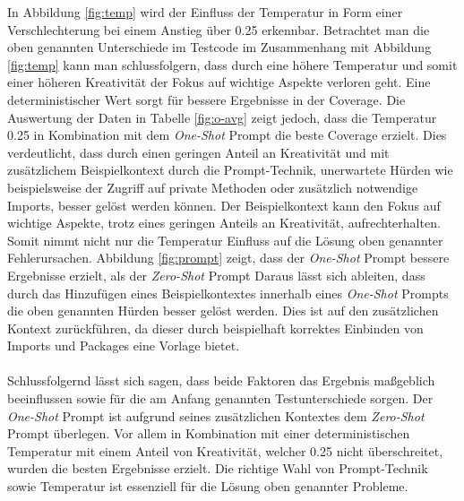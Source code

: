 In Abbildung \ref{fig:temp} wird der Einfluss der Temperatur in Form einer Verschlechterung bei einem Anstieg über 0.25 erkennbar. Betrachtet man die oben genannten Unterschiede im Testcode im Zusammenhang mit Abbildung \ref{fig:temp} kann man schlussfolgern, dass durch eine höhere Temperatur und somit einer höheren Kreativität der Fokus auf wichtige Aspekte verloren geht. Eine deterministischer Wert sorgt für bessere Ergebnisse in der Coverage. Die Auswertung der Daten in Tabelle \ref{fig:o-avg} zeigt jedoch, dass die Temperatur 0.25 in Kombination mit dem \textit{One-Shot} Prompt die beste Coverage erzielt. Dies verdeutlicht, dass durch einen geringen Anteil an Kreativität und mit zusätzlichem Beispielkontext durch die Prompt-Technik, unerwartete Hürden wie beispielsweise der Zugriff auf private Methoden oder zusätzlich notwendige Imports, besser gelöst werden können. Der Beispielkontext kann den Fokus auf wichtige Aspekte, trotz eines geringen Anteils an Kreativität, aufrechterhalten.\\
Somit nimmt nicht nur die Temperatur Einfluss auf die Lösung oben genannter Fehlerursachen. Abbildung \ref{fig:prompt} zeigt, dass der \textit{One-Shot} Prompt bessere Ergebnisse erzielt, als der \textit{Zero-Shot} Prompt Daraus lässt sich ableiten, dass durch das Hinzufügen eines Beispielkontextes innerhalb eines \textit{One-Shot} Prompts die oben genannten Hürden besser gelöst werden. Dies ist auf den zusätzlichen Kontext zurückführen, da dieser durch beispielhaft korrektes Einbinden von Imports und Packages eine Vorlage bietet.\\\\
Schlussfolgernd lässt sich sagen, dass beide Faktoren das Ergebnis maßgeblich beeinflussen sowie für die am Anfang genannten Testunterschiede sorgen. Der \textit{One-Shot} Prompt ist aufgrund seines zusätzlichen Kontextes dem \textit{Zero-Shot} Prompt überlegen. Vor allem in Kombination mit einer deterministischen Temperatur mit einem Anteil von Kreativität, welcher 0.25 nicht überschreitet, wurden die besten Ergebnisse erzielt. Die richtige Wahl von Prompt-Technik sowie Temperatur ist essenziell für die Lösung oben genannter Probleme.

